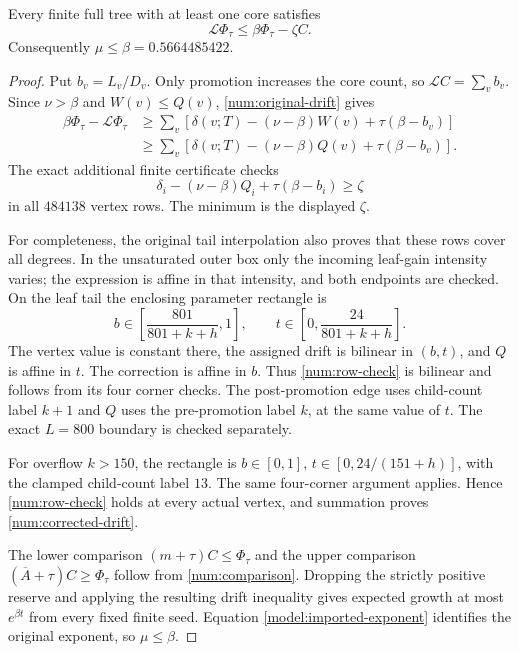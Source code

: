 \begin{theorem}\label{num:drift}
Every finite full tree with at least one core satisfies
\begin{equation}\label{num:corrected-drift}
 \mathcal L\Phi_\tau\le\beta\Phi_\tau-\zeta C.
\end{equation}
Consequently $\mu\le\beta=0.5664485422$.
\end{theorem}
\begin{proof}
Put $b_v=L_v/D_v$. Only promotion increases the core count, so
$\mathcal LC=\sum_v b_v$. Since $\nu>\beta$ and $W(v)\le Q(v)$,
\eqref{num:original-drift} gives
\begin{align*}
 \beta\Phi_\tau-\mathcal L\Phi_\tau
 &\ge\sum_v\left[\delta(v;T)-(\nu-\beta)W(v)
                            +\tau(\beta-b_v)\right]\\
 &\ge\sum_v\left[\delta(v;T)-(\nu-\beta)Q(v)
                            +\tau(\beta-b_v)\right].
\end{align*}
The exact additional finite certificate checks
\begin{equation}\label{num:row-check}
 \delta_i-(\nu-\beta)Q_i+\tau(\beta-b_i)\ge\zeta
\end{equation}
in all $484138$ vertex rows. The minimum is the displayed $\zeta$.

For completeness, the original tail interpolation also proves that
these rows cover all degrees. In the unsaturated outer box only the
incoming leaf-gain intensity varies; the expression is affine in
that intensity, and both endpoints are checked. On the leaf tail the
enclosing parameter rectangle is
\[
 b\in\left[\frac{801}{801+k+h},1\right],\qquad
 t\in\left[0,\frac{24}{801+k+h}\right].
\]
The vertex value is constant there, the assigned drift is bilinear in
$(b,t)$, and $Q$ is affine in $t$. The correction is affine in $b$.
Thus \eqref{num:row-check} is bilinear and follows from its four corner
checks. The post-promotion edge uses child-count label $k+1$ and $Q$
uses the pre-promotion label $k$, at the same value of $t$. The exact
$L=800$ boundary is checked separately.

For overflow $k>150$, the rectangle is
$b\in[0,1]$, $t\in[0,24/(151+h)]$, with the clamped child-count
label $13$. The same four-corner argument applies. Hence
\eqref{num:row-check} holds at every actual vertex, and summation
proves \eqref{num:corrected-drift}.

The lower comparison $(m+\tau)C\le\Phi_\tau$ and the upper comparison
$(\overline A+\tau)C\ge\Phi_\tau$ follow from
\eqref{num:comparison}. Dropping the strictly positive reserve and
applying the resulting drift inequality gives expected growth at most
$e^{\beta t}$ from every fixed finite seed. Equation
\eqref{model:imported-exponent} identifies the original exponent,
so $\mu\le\beta$.
\end{proof}

